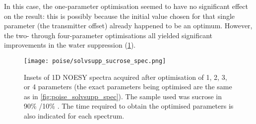In this case, the one-parameter optimisation seemed to have no significant effect on the result: this is possibly because the initial value chosen for that single parameter (the transmitter offset) already happened to be an optimum.
However, the two- through four-parameter optimisations all yielded significant improvements in the water suppression (\cref{fig:poise_solvsupp_sucrose_spec}).

\begin{figure}[htb]
    \centering
    \texttt{[image: poise/solvsupp\_sucrose\_spec.png]}
    \caption[1D NOESY spectra of sucrose sample before and after optimisation]{
        Insets of 1D NOESY spectra acquired after optimisation of 1, 2, 3, or 4 parameters (the exact parameters being optimised are the same as in \cref{fig:poise_solvsupp_spec}).
        The sample used was sucrose in 90\% /10\% .
        The time required to obtain the optimised parameters is also indicated for each spectrum.
    }
    \label{fig:poise_solvsupp_sucrose_spec}
\end{figure}
